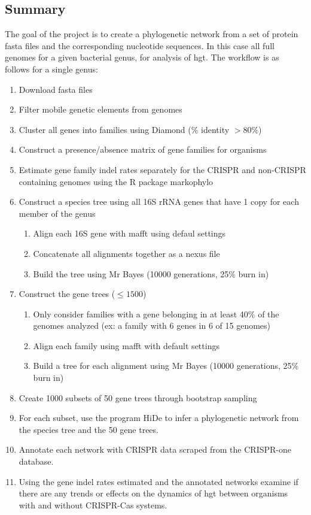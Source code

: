 \subsection{Summary}
The goal of the project is to create a phylogenetic network from a set of protein fasta files and the corresponding nucleotide sequences.
In this case all full genomes for a given bacterial genus, for analysis of \ac{hgt}.
The workflow is as follows for a single genus:
\begin{enumerate}
    \item Download fasta files
    \item Filter mobile genetic elements from genomes
    \item Cluster all genes into families using Diamond (\% identity $> 80\%$)
    \item Construct a presence/absence matrix of gene families for organisms
    \item Estimate gene family indel rates separately for the CRISPR and non-CRISPR containing genomes using the R package markophylo
    \item Construct a species tree using all 16S rRNA genes that have 1 copy for each member of the genus
    \begin{enumerate}
        \item Align each 16S gene with mafft using defaul settings
        \item Concatenate all alignments together as a nexus file
        \item Build the tree using Mr Bayes (10000 generations, 25\% burn in)
    \end{enumerate}
    \item Construct the gene trees ($\leq 1500$)
    \begin{enumerate}
        \item Only consider families with a gene belonging in at least 40\% of the genomes analyzed (ex: a family with 6 genes in 6 of 15 genomes)
        \item Align each family using mafft with default settings
        \item Build a tree for each alignment using Mr Bayes (10000 generations, 25\% burn in)
    \end{enumerate}
    \item Create 1000 subsets of 50 gene trees through bootstrap sampling
    \item For each subset, use the program HiDe to infer a phylogenetic network from the species tree and the 50 gene trees.
    \item Annotate each network with CRISPR data scraped from the CRISPR-one database.
    \item Using the gene indel rates estimated and the annotated networks examine if there are any trends or effects on the dynamics of \ac{hgt} between organisms with and without CRISPR-Cas systems.
\end{enumerate}
